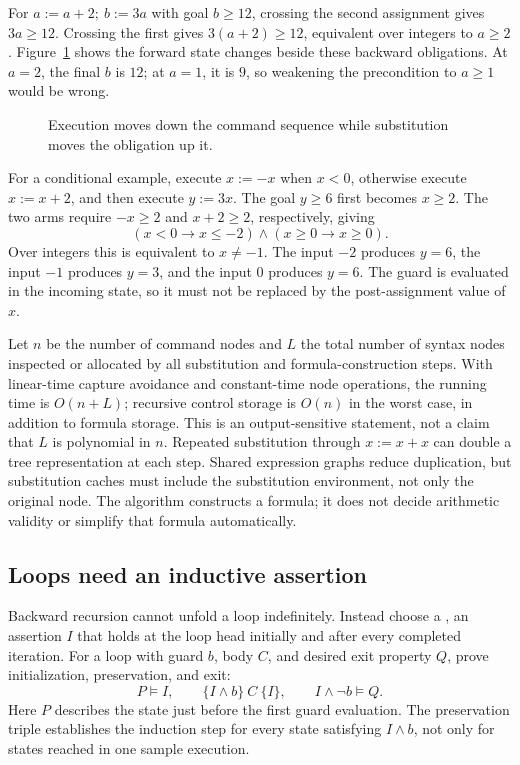 For $a:=a+2;\ b:=3a$ with goal $b\geq12$, crossing the second assignment gives $3a\geq12$.
Crossing the first gives $3(a+2)\geq12$, equivalent over integers to $a\geq2$.
Figure~\ref{fig:ch40-backward} shows the forward state changes beside these backward obligations.
At $a=2$, the final $b$ is $12$; at $a=1$, it is $9$, so weakening the precondition to $a\geq1$ would be wrong.

\begin{figure}
\centering

\caption{Execution moves down the command sequence while substitution moves the obligation up it.}
\label{fig:ch40-backward}
\end{figure}

For a conditional example, execute $x:=-x$ when $x<0$, otherwise execute $x:=x+2$, and then execute $y:=3x$.
The goal $y\geq6$ first becomes $x\geq2$.
The two arms require $-x\geq2$ and $x+2\geq2$, respectively, giving
\[
  (x<0\rightarrow x\leq-2)\land
  (x\geq0\rightarrow x\geq0).
\]
Over integers this is equivalent to $x\neq-1$.
The input $-2$ produces $y=6$, the input $-1$ produces $y=3$, and the input $0$ produces $y=6$.
The guard is evaluated in the incoming state, so it must not be replaced by the post-assignment value of $x$.

Let $n$ be the number of command nodes and $L$ the total number of syntax nodes inspected or allocated by all substitution and formula-construction steps.
With linear-time capture avoidance and constant-time node operations, the running time is $O(n+L)$; recursive control storage is $O(n)$ in the worst case, in addition to formula storage.
This is an output-sensitive statement, not a claim that $L$ is polynomial in $n$.
Repeated substitution through $x:=x+x$ can double a tree representation at each step.
Shared expression graphs reduce duplication, but substitution caches must include the substitution environment, not only the original node.
The algorithm constructs a formula; it does not decide arithmetic validity or simplify that formula automatically.

\subsection{Loops need an inductive assertion}
\label{sec:ch40-loop-proof}

Backward recursion cannot unfold a loop indefinitely.
Instead choose a , an assertion $I$ that holds at the loop head initially and after every completed iteration.
For a loop with guard $b$, body $C$, and desired exit property $Q$, prove initialization, preservation, and exit:
\[
  P\models I,\qquad
  \{I\land b\}\ C\ \{I\},\qquad
  I\land\neg b\models Q.
\]
Here $P$ describes the state just before the first guard evaluation.
The preservation triple establishes the induction step for every state satisfying $I\land b$, not only for states reached in one sample execution.

